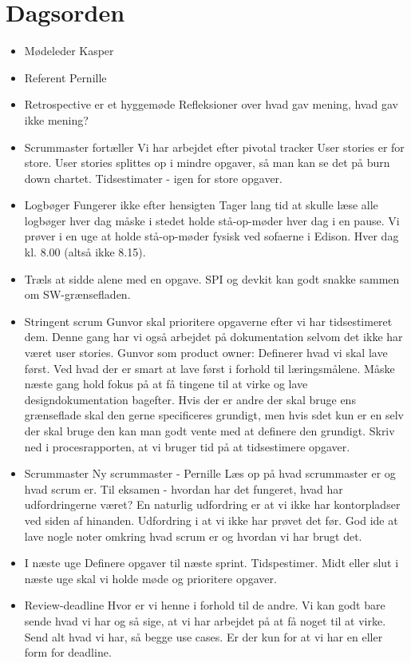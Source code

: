 \documentclass{article}
\begin{document}
	\section{Dagsorden}
	\begin{itemize}
		\item Mødeleder
		\subitem Kasper
		\item Referent
		\subitem Pernille
		\item Retrospective er et hyggemøde
		\subitem Refleksioner over hvad gav mening, hvad gav ikke mening? 
		\item Scrummaster fortæller
		\subitem Vi har arbejdet efter pivotal tracker
		\subitem User stories er for store. 
		\subitem User stories splittes op i mindre opgaver, så man kan se det på burn down chartet. 
		\subitem Tidsestimater - igen for store opgaver. 
		\item Logbøger 
		\subitem Fungerer ikke efter hensigten
		\subitem Tager lang tid at skulle læse alle logbøger hver dag 
		\subitem måske i stedet holde stå-op-møder hver dag i en pause. 
		\subitem Vi prøver i en uge at holde stå-op-møder fysisk ved sofaerne i Edison. Hver dag kl. 8.00 (altså ikke 8.15). 
		\item Træls at sidde alene med en opgave. 
		\subitem SPI og devkit kan godt snakke sammen om SW-grænsefladen. 
		\item Stringent scrum 
		\subitem Gunvor skal prioritere opgaverne efter vi har tidsestimeret dem. 
		\subitem Denne gang har vi også arbejdet på dokumentation selvom det ikke har været user stories. 
		\subitem Gunvor som product owner: Definerer hvad vi skal lave først. Ved hvad der er smart at lave først i forhold til læringsmålene. 
		\subitem Måske næste gang hold fokus på at få tingene til at virke og lave designdokumentation bagefter. 
		\subitem Hvis der er andre der skal bruge ens grænseflade skal den gerne specificeres grundigt, men hvis sdet kun er en selv der skal bruge den kan man godt vente med at definere den grundigt. 
		\subitem Skriv ned i procesrapporten, at vi bruger tid på at tidsestimere opgaver. 
		\item Scrummaster
		\subitem Ny scrummaster - Pernille 
		\subitem Læs op på hvad scrummaster er og hvad scrum er. 
		\subitem Til eksamen - hvordan har det fungeret, hvad har udfordringerne været? En naturlig udfordring er at vi ikke har kontorpladser ved siden af hinanden. 
		\subitem Udfordring i at vi ikke har prøvet det før. 
		\subitem God ide at lave nogle noter omkring hvad scrum er og hvordan vi har brugt det. 
		\item I næste uge
		\subitem Definere opgaver til næste sprint. 
		\subitem Tidspestimer. 
		\subitem Midt eller slut i næste uge skal vi holde møde og prioritere opgaver. 
		\item Review-deadline
		\subitem Hvor er vi henne i forhold til de andre. 
		\subitem Vi kan godt bare sende hvad vi har og så sige, at vi har arbejdet på at få noget til at virke. 
		\subitem Send alt hvad vi har, så begge use cases. 
		\subitem Er der kun for at vi har en eller form for deadline. 
		
		

	\end{itemize}
\end{document}
